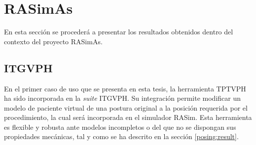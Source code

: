 \clearpage
\section{RASimAs}

En esta sección se procederá a presentar los resultados obtenidos dentro del contexto del proyecto \ac{RASimAs}. 

\subsection{ITGVPH}
\label{result:herramienta}

En el primer caso de uso que se presenta en esta tesis, la herramienta \ac{TPTVPH} ha sido incorporada en la \emph{suite} \ac{ITGVPH}. Su integración permite modificar un modelo de paciente virtual de una postura original a la posición requerida por el procedimiento, la cual será incorporada en el simulador \ac{RASim}. Esta herramienta es flexible y robusta ante modelos incompletos o del que no se dispongan sus propiedades mecánicas, tal y como se ha descrito en la sección \ref{posing:result}. 






